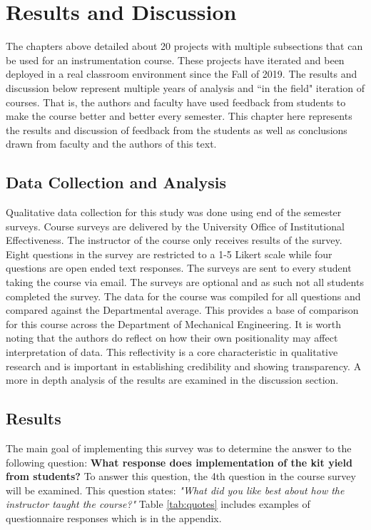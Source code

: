 \section{Results and Discussion}

The chapters above detailed about 20 projects with multiple
subsections that can be used for
an instrumentation course. These projects have iterated and been
deployed in a real classroom environment since the Fall of 2019. The
results and discussion below represent multiple years of analysis and
``in the field" iteration of courses. That is, the authors and faculty
have used feedback from students to make the course better and better
every semester. This chapter here represents the results and
discussion of feedback from the students as well as conclusions drawn
from faculty and the authors of this text. 

\subsection{Data Collection and Analysis}

Qualitative data collection for this study was done using end of the
semester surveys. Course surveys are delivered by the University
Office of Institutional Effectiveness. The instructor of the course
only receives results of the survey. Eight questions in the survey are
restricted to a 1-5 Likert scale while four questions are open ended
text responses\cite{likert}. The surveys are sent to every student
taking the course via email. The surveys are optional and as such not
all students completed the survey. The data for the course was
compiled for all questions and compared against the Departmental
average. This provides a base of comparison for this course across the
Department of Mechanical Engineering. It is worth noting that the
authors do reflect on how their own positionality may affect
interpretation of data. This reflectivity is a core characteristic in
qualitative research and is important in establishing credibility and
showing transparency. A more in depth analysis of the results are
examined in the discussion section.  

\subsection{Results}

The main goal of implementing this survey was to determine the answer
to the following question: {\bf What response does implementation of
  the kit yield from students?} To answer this question, the 4th
question in the course survey will be examined. This question states:
{\it "What did you like best about how the instructor taught the
  course?"} Table \ref{tab:quotes} includes examples of questionnaire
responses which is in the appendix.

